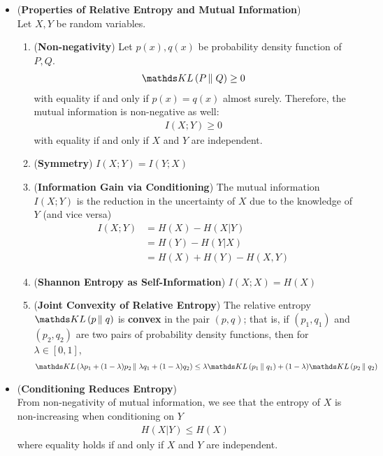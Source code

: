 \documentclass[11pt]{article}
\begin{document}
\begin{itemize}
\item \begin{proposition} (\textbf{Properties of Relative Entropy and Mutual Information})  \citep{thomas2006elements}\\
Let $X, Y$ be random variables.
\begin{enumerate}
\item (\textbf{Non-negativity})  Let $p(x), q(x)$ be probability density function of $P ,Q$.
\begin{align*}
\kl{P}{Q} \ge 0
\end{align*} with equality if and only if $p(x) = q(x)$ almost surely. Therefore, the mutual information is non-negative as well:
\begin{align*}
I(X; Y) \ge 0
\end{align*} with equality if and only if $X$ and $Y$ are independent.
\item (\textbf{Symmetry})  $I(X; Y) = I(Y; X)$
\item (\textbf{Information Gain via Conditioning}) The mutual information $I(X; Y)$ is the reduction in the uncertainty of $X$ due to the knowledge of $Y$ (and vice versa)
\begin{align}
I(X; Y) &= H(X) - H(X | Y) \label{eqn: mutual_information_gain}\\
&= H(Y) - H(Y | X) \nonumber\\
&= H(X) + H(Y) - H(X, Y) \nonumber
\end{align}
\item (\textbf{Shannon Entropy as Self-Information})  $I(X; X) = H(X)$
\item (\textbf{Joint Convexity of Relative Entropy}) The relative entropy $\kl{p}{q}$ is \textbf{convex} in the pair $(p, q)$; that is, if $(p_1, q_1)$ and $(p_2, q_2)$ are two pairs of probability density functions, then for $\lambda \in [0, 1]$,  
\begin{align}
\kl{\lambda p_1 + (1- \lambda) p_2}{\lambda q_1 + (1- \lambda) q_2} &\le \lambda \kl{p_1}{q_1} + (1- \lambda) \kl{p_2}{q_2} \label{ineqn: kl_divergence_joint_convex}
\end{align}
\end{enumerate}
\end{proposition}



\item \begin{proposition} (\textbf{Conditioning Reduces Entropy}) \citep{thomas2006elements}\\
From non-negativity of mutual information, we see that the entropy of $X$ is non-increasing when conditioning on $Y$
\begin{align}
H(X | Y) \le  H(X)  \label{ineqn: conditional_entropy}
\end{align} where equality holds if and only if $X$ and $Y$ are independent.
\end{proposition}



\end{itemize}
\end{document}
